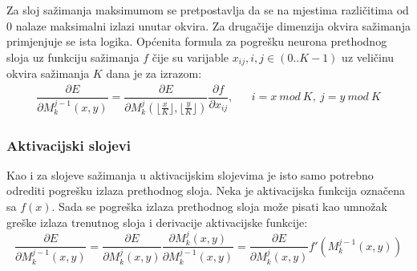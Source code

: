 \documentclass[times, utf8, zavrsni, numeric]{fer}
\begin{document}
Za sloj sažimanja maksimumom se pretpostavlja da se na mjestima različitima od 0 nalaze maksimalni izlazi unutar okvira. Za drugačije dimenzija okvira sažimanja primjenjuje se ista logika. Općenita formula za pogrešku neurona prethodnog sloja uz funkciju sažimanja $f$ čije su varijable $x_{ij}, i, j \in (0 .. K-1)$ uz veličinu okvira sažimanja $K$ dana je za izrazom:
\begin{align}\label{eq:pool-sloj-err}
\dfrac{\partial E}{\partial M^{j-1}_k (x, y)} = \dfrac{\partial E}{\partial M^j_k (\lfloor \frac{x}{K} \rfloor, \lfloor \frac{y}{K} \rfloor)} \dfrac{\partial f}{\partial x_{ij}}, && i = x\ mod\ K,\ j = y\ mod\ K
\end{align}  

\subsubsection{Aktivacijski slojevi}
Kao i za slojeve sažimanja u aktivacijskim slojevima je isto samo potrebno odrediti pogrešku izlaza prethodnog sloja. Neka je aktivacijska funkcija označena sa $f(x)$. Sada se pogreška izlaza prethodnog sloja može pisati kao umnožak greške izlaza trenutnog sloja i derivacije aktivacijske funkcije:
\begin{equation}\label{eq:act-sloj-err}
\dfrac{\partial E}{\partial M^{j-1}_k (x, y)} = \dfrac{\partial E}{\partial M^j_k (x, y)} \dfrac{\partial M^j_k (x, y)}{\partial M^{j-1}_k (x, y)} = \dfrac{\partial E}{\partial M^j_k (x, y)} f'(M^{j-1}_k (x, y))
\end{equation}
\end{document}

